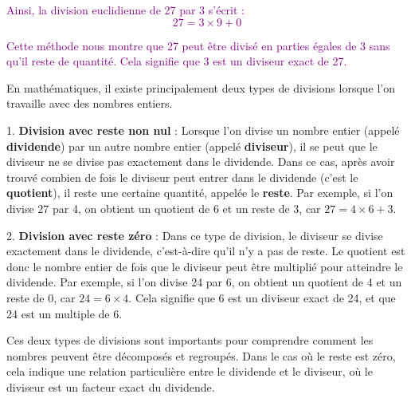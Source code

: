 \documentclass{article}
\begin{document}
\textcolor{purple}{Ainsi, la division euclidienne de 27 par 3 s'écrit : 
\[ 27 = 3 \times 9 + 0 \]}

\textcolor{purple}{Cette méthode nous montre que 27 peut être divisé en parties égales de 3 sans qu'il reste de quantité. Cela signifie que 3 est un diviseur exact de 27.}

\vspace{0.15cm}

\begin{tcolorbox}[colback=cyan!10!white, colframe=pink!75!black, title=\textcolor{white}{Les types de divisions}, sharp corners=southwest]
En mathématiques, il existe principalement deux types de divisions lorsque l'on travaille avec des nombres entiers.

\vspace{0.2cm}

1. \textbf{Division avec reste non nul} : Lorsque l'on divise un nombre entier (appelé \textbf{dividende}) par un autre nombre entier (appelé \textbf{diviseur}), il se peut que le diviseur ne se divise pas exactement dans le dividende. Dans ce cas, après avoir trouvé combien de fois le diviseur peut entrer dans le dividende (c'est le \textbf{quotient}), il reste une certaine quantité, appelée le \textbf{reste}. Par exemple, si l'on divise 27 par 4, on obtient un quotient de 6 et un reste de 3, car \(27 = 4 \times 6 + 3\).

\vspace{0.2cm}

2. \textbf{Division avec reste zéro} : Dans ce type de division, le diviseur se divise exactement dans le dividende, c'est-à-dire qu'il n'y a pas de reste. Le quotient est donc le nombre entier de fois que le diviseur peut être multiplié pour atteindre le dividende. Par exemple, si l'on divise 24 par 6, on obtient un quotient de 4 et un reste de 0, car \(24 = 6 \times 4\). Cela signifie que 6 est un diviseur exact de 24, et que 24 est un multiple de 6.

\vspace{0.2cm}

Ces deux types de divisions sont importants pour comprendre comment les nombres peuvent être décomposés et regroupés. Dans le cas où le reste est zéro, cela indique une relation particulière entre le dividende et le diviseur, où le diviseur est un facteur exact du dividende.
\end{tcolorbox}

\vspace{0.15cm}
\end{document}
